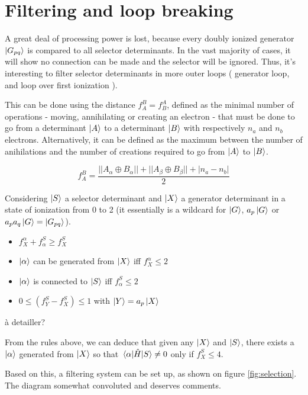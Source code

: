 \documentclass[./thesis.tex]{subfiles}
\begin{document}

\section{Filtering and loop breaking}
A great deal of processing power is lost, because every doubly ionized generator $\ket {G_{pq}}$ is compared to all selector determinants. In the vast majority of cases, it will show no connection can be made and the selector will be ignored. Thus, it's interesting to filter selector determinants in more outer loops ( generator loop, and loop over first ionization ).

This can be done using the distance $f_A^B = f_B^A$, defined as the minimal number of operations - moving, annihilating or creating an electron - that must be done to go from a determinant $\ket A$ to a determinant $\ket B$ with respectively $n_a$ and $n_b$ electrons.
Alternatively, it can be defined as the maximum between the number of anihilations and the number of creations required to go from $\ket A$ to $\ket B$.



\begin{equation}
f_A^B = \frac{||A_\alpha \oplus B_\alpha|| + ||A_\beta \oplus B_\beta|| + |n_a-n_b|}{2}
\end{equation}


Considering $\ket S$ a selector determinant and $\ket X$ a generator determinant in a state of ionization from 0 to 2 (it essentially is a wildcard for $\ket G$, $a_{p} \ket G$ or $a_{p} a_{q} \ket G = \ket {G_{pq}}$).

\begin{itemize}
\item
$f_X^\alpha + f_\alpha^S \geq f_X^S$
\item
$\ket \alpha$ can be generated from $\ket X$ iff $f_X^\alpha \leq 2$
\item
$\ket \alpha$ is connected to $\ket S$ iff $f_\alpha^S \leq 2$
\item
$0 \leq (f_Y^S - f_X^S) \leq 1$ with $\ket Y = a_p \ket X$
\end{itemize}

\alert{à detailler?}

From the rules above, we can deduce that given any $\ket X$ and $\ket S$, there exists a ${\ket{\alpha}}$ generated from $\ket X$ so that $\mel{\alpha}{\hat{H}}{S} \neq 0$ only if $f_X^S \leq 4$.

Based on this, a filtering system can be set up, as shown on figure \ref{fig:selection}. The diagram somewhat convoluted and deserves comments.
\end{document}
